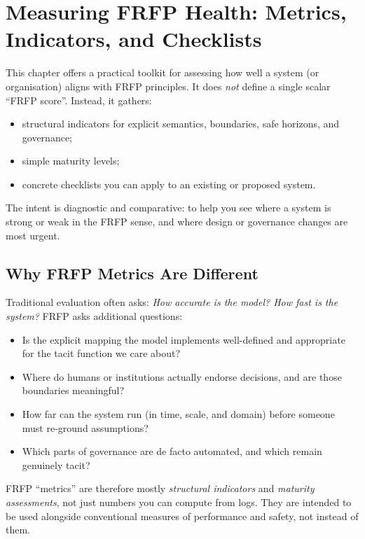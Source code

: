 \chapter{Measuring FRFP Health: Metrics, Indicators, and Checklists}
\label{ch:frfp-metrics}

This chapter offers a practical toolkit for assessing how well a system
(or organisation) aligns with FRFP principles.
It does \emph{not} define a single scalar ``FRFP score''.
Instead, it gathers:

\begin{itemize}
  \item structural indicators for explicit semantics, boundaries, safe
        horizons, and governance;
  \item simple maturity levels;
  \item concrete checklists you can apply to an existing or proposed
        system.
\end{itemize}

The intent is diagnostic and comparative:
to help you see where a system is strong or weak in the FRFP sense,
and where design or governance changes are most urgent.

\section{Why FRFP Metrics Are Different}

Traditional evaluation often asks:
\emph{How accurate is the model? How fast is the system?}
FRFP asks additional questions:

\begin{itemize}
  \item Is the explicit mapping the model implements well-defined and
        appropriate for the tacit function we care about?
  \item Where do humans or institutions actually endorse decisions, and
        are those boundaries meaningful?
  \item How far can the system run (in time, scale, and domain) before
        someone must re-ground assumptions?
  \item Which parts of governance are de facto automated, and which
        remain genuinely tacit?
\end{itemize}

FRFP ``metrics'' are therefore mostly \emph{structural indicators} and
\emph{maturity assessments}, not just numbers you can compute from logs.
They are intended to be used alongside conventional measures of
performance and safety, not instead of them.

